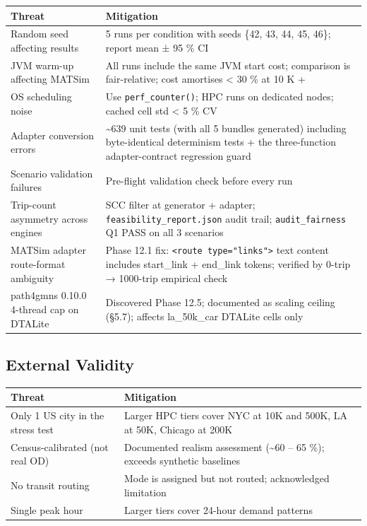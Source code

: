 \begin{longtable}[]{@{}ll@{}}
\toprule\noalign{}
Threat & Mitigation \\
\midrule\noalign{}
\endhead
\bottomrule\noalign{}
\endlastfoot
Random seed affecting results & 5 runs per condition with seeds \{42,
43, 44, 45, 46\}; report mean ± 95 \% CI \\
JVM warm-up affecting MATSim & All runs include the same JVM start cost;
comparison is fair-relative; cost amortises \textless{} 30 \% at 10 K
+ \\
OS scheduling noise & Use \texttt{perf\_counter()}; HPC runs on
dedicated nodes; cached cell std \textless{} 5 \% CV \\
Adapter conversion errors & \textasciitilde639 unit tests (with all 5
bundles generated) including byte-identical determinism tests + the
three-function adapter-contract regression guard \\
Scenario validation failures & Pre-flight validation check before every
run \\
Trip-count asymmetry across engines & SCC filter at generator + adapter;
\texttt{feasibility\_report.json} audit trail; \texttt{audit\_fairness}
Q1 PASS on all 3 scenarios \\
MATSim adapter route-format ambiguity & Phase 12.1 fix:
\texttt{\textless{}route\ type="links"\textgreater{}} text content
includes start\_link + end\_link tokens; verified by 0-trip → 1000-trip
empirical check \\
path4gmns 0.10.0 4-thread cap on DTALite & Discovered Phase 12.5;
documented as scaling ceiling (§5.7); affects la\_50k\_car DTALite cells
only \\
\end{longtable}

\subsection{External Validity}\label{462-external-validity}

\begin{longtable}[]{@{}ll@{}}
\toprule\noalign{}
Threat & Mitigation \\
\midrule\noalign{}
\endhead
\bottomrule\noalign{}
\endlastfoot
Only 1 US city in the stress test & Larger HPC tiers cover NYC at 10K
and 500K, LA at 50K, Chicago at 200K \\
Census-calibrated (not real OD) & Documented realism assessment
(\textasciitilde60 -- 65 \%); exceeds synthetic baselines \\
No transit routing & Mode is assigned but not routed; acknowledged
limitation \\
Single peak hour & Larger tiers cover 24-hour demand patterns \\
\end{longtable}

